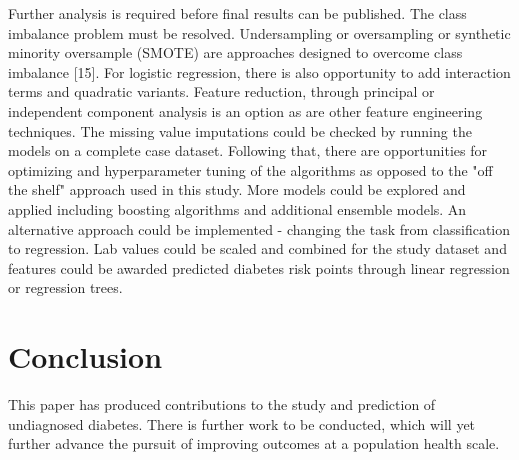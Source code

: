 \documentclass[twoside,11pt]{article}
\begin{document}
Further analysis is required before final results can be published. The class imbalance problem must be resolved. Undersampling or oversampling or synthetic minority oversample (SMOTE) are approaches designed to overcome class imbalance [15]. For logistic regression, there is also opportunity to add interaction terms and quadratic variants. Feature reduction, through principal or independent component analysis is an option as are other feature engineering techniques. The missing value imputations could be checked by running the models on a complete case dataset. Following that, there are opportunities for optimizing and hyperparameter tuning of the algorithms as opposed to the "off the shelf" approach used in this study. More models could be explored and applied including boosting algorithms and additional ensemble models. An alternative approach could be implemented - changing the task from classification to regression. Lab values could be scaled and combined for the study dataset and features could be awarded predicted diabetes risk points through linear regression or regression trees. 

\section{Conclusion} 
This paper has produced contributions to the study and prediction of undiagnosed diabetes. There is further work to be conducted, which will yet further advance the pursuit of improving outcomes at a population health scale. 
\end{document}
